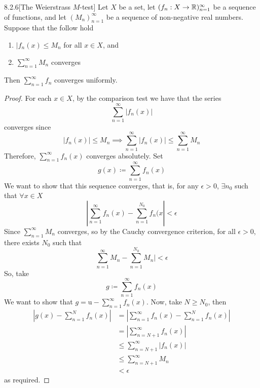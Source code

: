 \documentclass[openany]{report}
\begin{document}
\begin{manualtheorem}{8.2.6}[The Weierstrass $M$-test]
    Let $X$ be a set, let $(f_n: X \rightarrow \mathbb{R})_{n=1}^\infty$ be a sequence of functions, and let $(M_n)_{n=1}^\infty$ be a sequence of non-negative real numbers. Suppose that the follow hold
    \begin{enumerate}[label=(\roman*)]
        \item $|f_n(x) \leq M_n$ for all $x \in X$, and 
        \item $\sum\limits_{n=1}^\infty M_n$ converges 
    \end{enumerate}
    Then $\sum\limits_{n=1}^\infty f_n$ converges uniformly. 
\end{manualtheorem}

\begin{proof}
    For each $x \in X$, by the comparison test we have that the series
    \[\sum_{n=1}^\infty |f_n(x)|\]
    converges since 
    \[|f_n(x)| \leq M_n \implies \sum_{n=1}^\infty |f_n(x)| \leq \sum_{n=1}^\infty M_n\]
    Therefore, $\sum\limits_{n=1}^\infty f_n(x)$ converges absolutely. Set 
    \[g(x) \coloneqq \sum_{n=1}^\infty f_n(x)\]
    We want to show that this sequence converges, that is, for any $\epsilon > 0$, $\exists n_0$ such that $\forall x \in X$
    \[|\sum_{n=1}^\infty f_n(x)- \sum_{n=1}^{N_0} f_n(x| < \epsilon\]
    Since $\sum\limits_{n=1}^\infty M_n$ converges, so by the Cauchy convergence criterion, for all $\epsilon > 0$, there exists $N_0$ such that 
    \[\sum_{n=1}^\infty M_n- \sum_{n=1}^{N_0} M_n| < \epsilon \]
    So, take 
    \[g \coloneqq \sum_{n=1}^\infty f_n(x)\]
    We want to show that $g = \text{u}-\sum_{n=1}^\infty f_n(x)$. Now, take $N \geq N_0$, then
    \begin{align*}
        |g(x) - \sum_{n=1}^N f_n(x)| &= |\sum_{n=1}^\infty f_n(x) - \sum_{n=1}^N f_n(x)|\\
        &= |\sum_{n=N+1}^\infty f_n(x)|\\
        &\leq \sum_{n=N+1}^\infty |f_n(x)|\\
        &\leq \sum_{n=N+1}^\infty M_n\\
        &< \epsilon
    \end{align*} 
    as required.
\end{proof}
\end{document}
